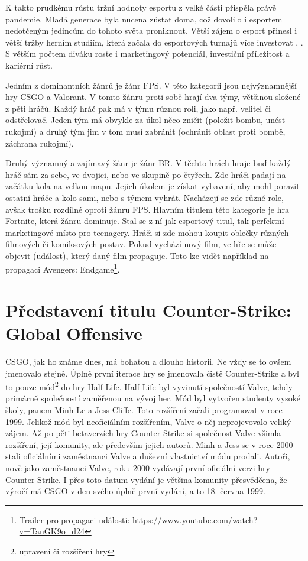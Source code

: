 K takto prudkému růstu tržní hodnoty esportu z velké části přispěla právě pandemie. Mladá generace byla nucena zůstat doma, což dovolilo i esportem nedotčeným jedincům do
tohoto světa proniknout. Větší zájem o esport přinesl i větší tržby herním studiím, která začala do esportových turnajů více
investovat \cite{professeur_esea_2022}, \cite{liquipedianet_pgl_2021}. S větším počtem diváku roste i marketingový potenciál, investiční příležitost a kariérní růst.

Jedním z dominantních žánrů je žánr \ac{FPS}. V této kategorii jsou nejvýznamnější hry \ac{CSGO} a Valorant. V tomto žánru proti sobě hrají dva týmy, většinou složené z pěti hráčů.
Každý hráč pak má v týmu různou roli, jako např. velitel či odstřelovač. Jeden tým má obvykle za úkol něco zničit (položit bombu, unést rukojmí) a druhý
tým jim v tom musí zabránit (ochránit oblast proti bombě, záchrana rukojmí).

Druhý významný a zajímavý žánr je žánr \acf{BR}. V těchto hrách hraje buď každý hráč sám za sebe, ve dvojici, nebo ve skupině po čtyřech. Zde hráči padají na začátku kola na velkou mapu.
Jejich úkolem je získat vybavení, aby mohl porazit ostatní hráče a kolo sami, nebo s týmem vyhrát. Nacházejí se zde různé role, avšak trošku rozdílné
oproti žánru \ac{FPS}. Hlavním titulem této kategorie je hra Fortnite, která žánru dominuje. Stal se z ní jak esportový titul, tak perfektní marketingové místo pro teenagery.
Hráči si zde mohou koupit oblečky různých filmových či komiksových postav. Pokud vychází nový film, ve hře se může objevit  (událost),
který daný film propaguje. Toto lze vidět například na propagaci Avengers:
Endgame\footnote{Trailer pro propagaci události: \url{https://www.youtube.com/watch?v=TanGK9o_d24}}.

\section{Představení titulu Counter-Strike: Global Offensive}
\ac{CSGO}, jak ho známe dnes, má bohatou a dlouho historii. Ne vždy se to ovšem jmenovalo stejně. Úplně první iterace hry se jmenovala čistě Counter-Strike a byl to pouze
mód\footnote{upravení či rozšíření hry} do hry Half-Life. Half-Life byl vyvinutí společností Valve, tehdy primárně společností zaměřenou na vývoj her. Mód byl
vytvořen studenty vysoké školy, panem Minh Le a Jess Cliffe. Toto rozšíření začali programovat v roce 1999. Jelikož mód byl neoficiálním rozšířením, Valve o něj neprojevovalo
veliký zájem. Až po pěti betaverzích hry Counter-Strike si společnost Valve všimla rozšíření, její komunity, ale především jejich autorů. Minh a Jess se v roce 2000
stali oficiálními zaměstnanci Valve a duševní vlastnictví módu prodali. Autoři, nově jako zaměstnanci Valve, roku 2000 vydávají první oficiální verzi hry Counter-Strike.
 I přes toto  datum vydání je většina komunity přesvědčena, že výročí má \ac{CSGO} v den svého úplně první vydání, a to 18. června 1999.

